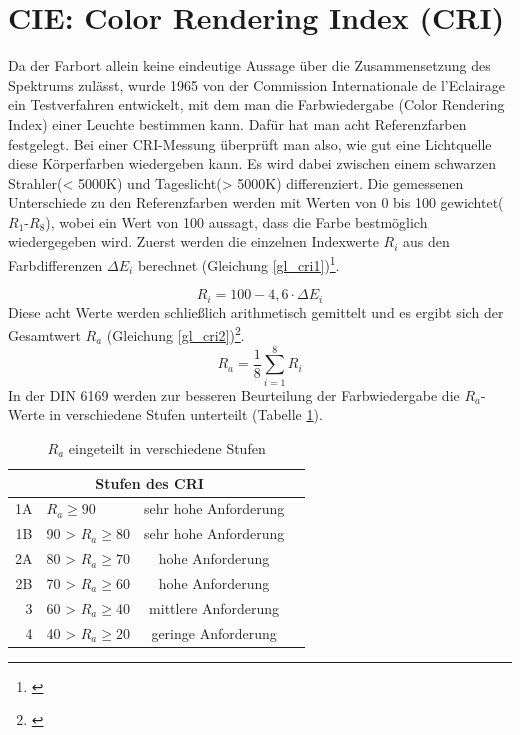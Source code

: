 \section{CIE: Color Rendering Index (CRI)} \label{sec_cri}

Da der Farbort allein keine eindeutige Aussage über die Zusammensetzung des Spektrums zulässt, wurde 1965 von der Commission Internationale de l'Eclairage ein Testverfahren entwickelt, mit dem man die Farbwiedergabe (Color Rendering Index) einer Leuchte bestimmen kann. Dafür hat man acht Referenzfarben festgelegt. Bei einer CRI-Messung überprüft man also, wie gut eine Lichtquelle diese Körperfarben wiedergeben kann. Es wird dabei zwischen einem schwarzen Strahler(< 5000K) und Tageslicht(> 5000K) differenziert. Die gemessenen Unterschiede zu den Referenzfarben werden mit Werten von 0 bis 100 gewichtet($R_{1}$-$R_{8}$), wobei ein Wert von 100 aussagt, dass die Farbe bestmöglich wiedergegeben wird. Zuerst werden die einzelnen Indexwerte $R_{i}$ aus den Farbdifferenzen $\Delta E_{i}$ berechnet (Gleichung \ref{gl_cri1})\footnote{\cite{davis_ohno}}.

	\begin{equation}\label{gl_cri1}
		R_{i} = 100 - 4,6 \cdot \Delta E_{i}
	\end{equation}
Diese acht Werte werden schließlich arithmetisch gemittelt und es ergibt sich der Gesamtwert $R_{a}$ (Gleichung \ref{gl_cri2})\footnote{\cite{production partner}}.
	\begin{equation}\label{gl_cri2}
		R_{a} =\frac{1}{8} \sum_{i=1}^{8} R_{i}
	\end{equation}
In der DIN 6169 werden zur besseren Beurteilung der Farbwiedergabe die $R_{a}$-Werte in verschiedene Stufen unterteilt (Tabelle \ref{t_cri}).

	\begin{table}[htp] 
		\centering
		\begin{tabular}{rlcc}  %
		\toprule
		\multicolumn{3}{c}{\large\sffamily Stufen des CRI}\\ 							
		\midrule
		1A & $R_{a} \geq 90$ & sehr hohe Anforderung\\ 
		1B & 90 > $R_{a} \geq 80$ & sehr hohe Anforderung\\
		2A & 80 > $R_{a} \geq 70$ & hohe Anforderung\\
		2B & 70 > $R_{a} \geq 60$ & hohe Anforderung\\
		3 & 60 > $R_{a} \geq 40$ & mittlere Anforderung\\
		4 & 40 > $R_{a} \geq 20$ & geringe Anforderung\\
		\bottomrule
		\end{tabular}
		\caption{$R_{a}$ eingeteilt in verschiedene Stufen\protect\footnotemark}	
		\label{t_cri}
	\end{table}

